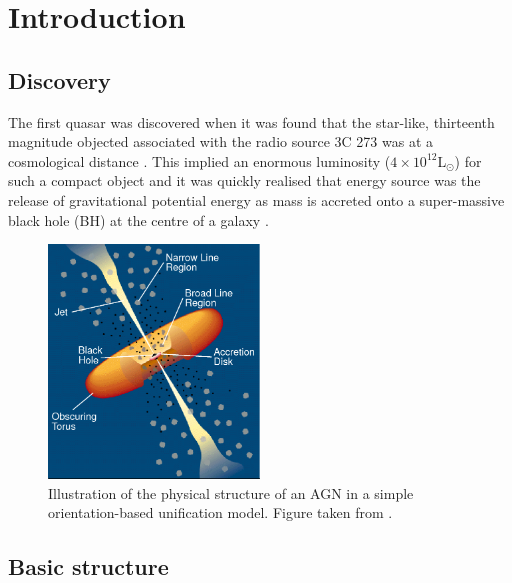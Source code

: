 
\chapter{Introduction}
\label{ch:intro}

\section{Discovery}

The first quasar was discovered when it was found that the star-like, thirteenth magnitude objected associated with the radio source 3C 273 was at a cosmological distance \citep[$z=0.158$;][]{schmidt63}. 
This implied an enormous luminosity ($4\times10^{12}$L$_\odot$) for such a compact object and it was quickly realised that energy source was the release of gravitational potential energy as mass is accreted onto a super-massive  black hole (BH) at the centre of a galaxy \citep[e.g.][]{hoyle63,salpeter64,lynden-bell69,lynden-bell71}. 

\begin{figure}
  \centering
  \includegraphics[width=0.5\textwidth]{figures/chapter05/urry_model}
  \caption[{Illustration of the physical structure of an AGN in a simple orientation-based unification model.}]{Illustration of the physical structure of an AGN in a simple orientation-based unification model. Figure taken from \citet{urry95}.}
  \label{fig:agnmodel}
\end{figure}

\section{Basic structure}

